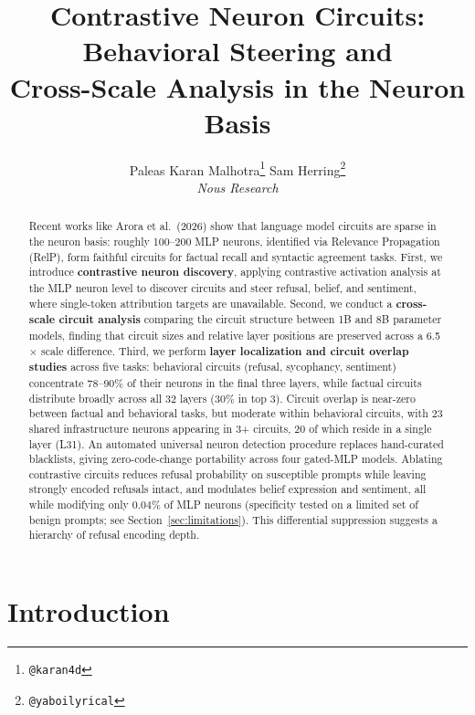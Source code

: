 \documentclass[11pt]{article}
\title{Contrastive Neuron Circuits: Behavioral Steering and \\ Cross-Scale Analysis in the Neuron Basis}
\author{%
  Paleas
  \quad
  Karan Malhotra\thanks{\texttt{@karan4d}}
  \quad
  Sam Herring\thanks{\texttt{@yaboilyrical}} \\[6pt]
  \textit{Nous Research}
}
\begin{document}
\maketitle

\begin{abstract}
Recent works like Arora et al.\ (2026) show that language model circuits are sparse in the neuron basis: roughly 100--200 MLP neurons, identified via Relevance Propagation (RelP), form faithful circuits for factual recall and syntactic agreement tasks.
First, we introduce \textbf{contrastive neuron discovery}, applying contrastive activation analysis at the MLP neuron level to discover circuits and steer refusal, belief, and sentiment, where single-token attribution targets are unavailable.
Second, we conduct a \textbf{cross-scale circuit analysis} comparing the circuit structure between 1B and 8B parameter models, finding that circuit sizes and relative layer positions are preserved across a 6.5$\times$ scale difference.
Third, we perform \textbf{layer localization and circuit overlap studies} across five tasks: behavioral circuits (refusal, sycophancy, sentiment) concentrate 78--90\% of their neurons in the final three layers, while factual circuits distribute broadly across all 32 layers (30\% in top 3).
Circuit overlap is near-zero between factual and behavioral tasks, but moderate within behavioral circuits, with 23 shared infrastructure neurons appearing in 3+ circuits, 20 of which reside in a single layer (L31).
An automated universal neuron detection procedure replaces hand-curated blacklists, giving zero-code-change portability across four gated-MLP models.
Ablating contrastive circuits reduces refusal probability on susceptible prompts while leaving strongly encoded refusals intact, and modulates belief expression and sentiment, all while modifying only 0.04\% of MLP neurons (specificity tested on a limited set of benign prompts; see Section~\ref{sec:limitations}).
This differential suppression suggests a hierarchy of refusal encoding depth.
\end{abstract}


\section{Introduction}
\label{sec:intro}
\end{document}
